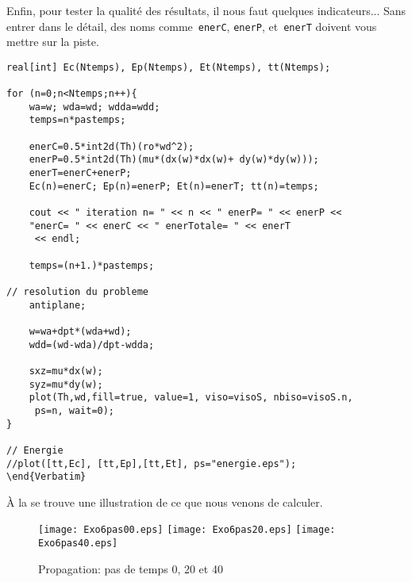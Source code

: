 Enfin, pour tester la qualité des résultats, il nous faut quelques indicateurs... Sans entrer dans le détail, des noms comme~\verb|enerC|, \verb|enerP|, et~\verb|enerT| doivent vous mettre sur la piste.
\begin{lstlisting}[firstnumber=last]
real[int] Ec(Ntemps), Ep(Ntemps), Et(Ntemps), tt(Ntemps); 

for (n=0;n<Ntemps;n++){	
	wa=w; wda=wd; wdda=wdd; 	
	temps=n*pastemps; 

	enerC=0.5*int2d(Th)(ro*wd^2);
	enerP=0.5*int2d(Th)(mu*(dx(w)*dx(w)+ dy(w)*dy(w)));
	enerT=enerC+enerP;
	Ec(n)=enerC; Ep(n)=enerP; Et(n)=enerT; tt(n)=temps; 
		
	cout << " iteration n= " << n << " enerP= " << enerP << 
    "enerC= " << enerC << " enerTotale= " << enerT 
     << endl;
	
	temps=(n+1.)*pastemps; 

// resolution du probleme 
	antiplane;
	
	w=wa+dpt*(wda+wd);
	wdd=(wd-wda)/dpt-wdda; 

	sxz=mu*dx(w);
	syz=mu*dy(w); 
	plot(Th,wd,fill=true, value=1, viso=visoS, nbiso=visoS.n, 
     ps=n, wait=0); 	
}

// Energie 
//plot([tt,Ec], [tt,Ep],[tt,Et], ps="energie.eps"); 
\end{Verbatim}
\end{lstlisting}

À la  se trouve une illustration de ce que nous venons de calculer.
\begin{figure}[h!]
  \center
  \texttt{[image: Exo6pas00.eps]} \hfill
  \texttt{[image: Exo6pas20.eps]} \hfill
  \texttt{[image: Exo6pas40.eps]}
  \caption{\label{Fig-Exo6} Propagation: pas de temps 0, 20 et 40}
\end{figure}

